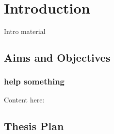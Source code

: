 
\chapter{Introduction}
Intro material

\section{Aims and Objectives}\label{s:aims}


\subsection{help something}

Content here:

\section{Thesis Plan}\label{s:thesisplan}

